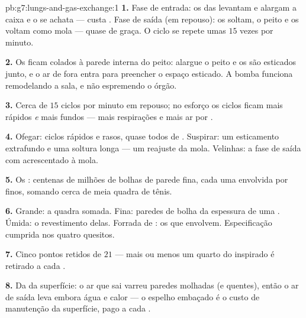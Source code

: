 \begin{solution}{pb:g7:lungs-and-gas-exchange:1}
\textbf{1.} Fase de entrada: os  das  levantam e
alargam a caixa e o  se achata --- custa . Fase de
saída (em repouso): os  soltam, o peito e os  voltam
como mola --- quase de graça. O ciclo se repete umas $15$ vezes por
minuto.

\textbf{2.} Os  ficam colados à parede interna do peito:
alargue o peito e os  são esticados junto, e o ar de fora entra
para preencher o espaço esticado. A bomba funciona remodelando a sala,
e não espremendo o órgão.

\textbf{3.} Cerca de $15$ ciclos por minuto em repouso; no esforço os
ciclos ficam mais rápidos \emph{e} mais fundos --- mais respirações e
mais ar por .

\textbf{4.} Ofegar: ciclos rápidos e rasos, quase todos de .
Suspirar: um esticamento extrafundo e uma soltura longa --- um reajuste
da mola. Velinhas: a fase de saída com  acrescentado à mola.

\textbf{5.} Os : centenas de milhões de bolhas de parede fina,
cada uma envolvida por  finos, somando cerca de meia quadra de
tênis.

\textbf{6.} Grande: a quadra somada. Fina: paredes de bolha da
espessura de uma . Úmida: o revestimento delas. Forrada de
: os  que envolvem. Especificação cumprida nos quatro
quesitos.

\textbf{7.} Cinco pontos retidos de $21$ --- mais ou menos um quarto do
 inspirado é retirado a cada .

\textbf{8.} Da  da superfície: o ar que sai varreu paredes
molhadas (e quentes), então o ar de saída leva embora água e calor ---
o espelho embaçado é o custo de manutenção da superfície, pago a cada
.


\end{solution}
